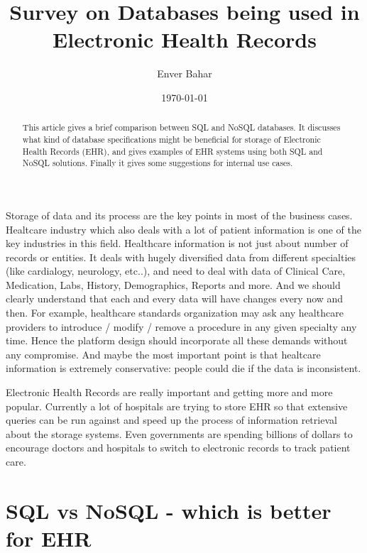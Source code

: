 \documentclass{article}
\begin{document}
\title{Survey on Databases being used in Electronic Health Records}   %
\author{Enver Bahar}         %
\date{\today}    %
\maketitle

\begin{abstract}
This article gives a brief comparison between SQL and NoSQL databases. It discusses what kind of database specifications might be beneficial for storage of Electronic Health Records (EHR), and gives examples of EHR systems using both SQL and NoSQL solutions. Finally it gives some suggestions for internal use cases. \\
\end{abstract} 

Storage of data and its process are the key points in most of the business cases.  Healtcare industry which also deals with a lot of patient information is one of the key industries in this field. Healthcare information is not just about number of records or entities. It deals with hugely diversified data from different specialties (like cardialogy, neurology, etc..), and need to deal with data of Clinical Care, Medication, Labs, History, Demographics, Reports and more. And we should clearly understand that each and every data will have changes every now and then. For example, healthcare standards organization may ask any healthcare providers to introduce / modify / remove a procedure in any given specialty any time. Hence the platform design should incorporate all these demands without any compromise\cite{online3}. And maybe the most important point is that healtcare information is extremely conservative: people could die if the data is inconsistent\cite{online4}.
 
Electronic Health Records are really important and getting more and more popular. Currently a lot of hospitals are trying to store EHR so that extensive queries can be run against and speed up the process of information retrieval about the storage systems. Even governments are spending billions of dollars to encourage doctors and hospitals to switch to electronic records to track patient care\cite{online5}.

\section{SQL vs NoSQL - which is better for EHR}
\end{document}
